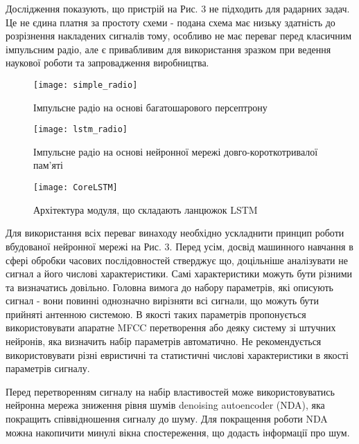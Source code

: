 Дослідження показують, що пристрій на Рис. 3 не підходить для радарних 
задач. Це не єдина платня за простоту схеми - подана схема має низьку 
здатність до розрізнення накладених сигналів тому, особливо не має 
переваг перед класичним імпульсним радіо, але є привабливим для 
використання зразком при ведення наукової роботи та запровадження 
виробництва.

\begin{figure}[htbp] \begin{center}
\texttt{[image: simple\_radio]}
\caption{Імпульсне радіо на основі багатошарового персептрону} 
\label{fig:mp_radio}
\end{center} \end{figure}

\begin{figure}[htbp] \begin{center}
\texttt{[image: lstm\_radio]}
\caption{Імпульсне радіо на основі нейронної мережі 
довго-короткотривалої пам'яті} \label{fig:lstm_radio}
\end{center} \end{figure}

\begin{figure}[htbp] \begin{center}
\texttt{[image: CoreLSTM]}
\caption{Архітектура модуля, що складають 
ланцюжок LSTM} \label{fig:lstm_core}
\end{center} \end{figure}

Для використання всіх переваг винаходу необхідно ускладнити принцип 
роботи вбудованої нейронної мережі на Рис. 3. Перед усім, досвід 
машинного навчання в сфері обробки часових послідовностей стверджує що, 
доцільніше аналізувати не сигнал а його числові характеристики. 
Самі характеристики можуть бути різними та визначатись довільно. 
Головна вимога до набору параметрів, які описують сигнал - вони повинні 
однозначно вирізняти всі сигнали, що можуть бути прийняті антенною 
системою. В якості таких параметрів пропонується використовувати 
апаратне MFCC перетворення або деяку систему зі штучних нейронів, 
яка визначить набір параметрів автоматично. Не рекомендується 
використовувати різні евристичні та статистичні числові 
характеристики в якості параметрів сигналу.

Перед перетворенням сигналу на набір властивостей може використовуватись 
нейронна мережа зниження рівня шумів denoising autoencoder (NDA), 
яка покращить співвідношення сигналу до шуму. Для покращення роботи 
NDA можна накопичити минулі вікна спостереження, що додасть 
інформації про шум.

